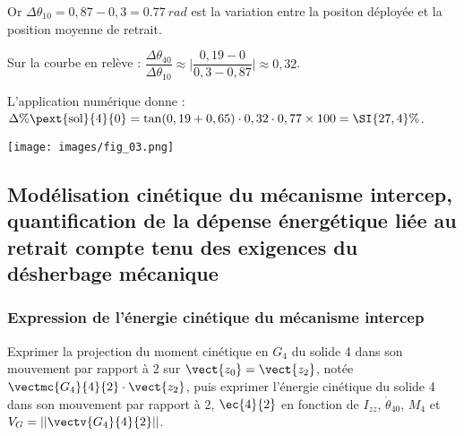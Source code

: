\documentclass[11pt]{article}
\begin{document}
\begin{UPSTIcorrige}
\begin{minipage}{0.55\textwidth}
Or $\Delta \theta_{10}=0,87-0,3=\SI{0,77}{rad}$ est la variation entre la positon déployée et la position moyenne de retrait.

Sur la courbe en relève  : $
\dfrac{\Delta \theta_{40}}{\Delta \theta_{10}}\approx \vert\dfrac{0,19-0}{0,3-0,87}\vert\approx 0,32
$.

L'application numérique donne : 
$\Delta \% \pext{\text{sol}}{4}{0}=\tan(0,19+0,65)\cdot 0,32 \cdot 0,77\times 100=\SI{27,4}{\%}$.

\end{minipage}
\begin{minipage}{0.4\textwidth}
\begin{center}
\texttt{[image: images/fig\_03.png]}
\end{center}
\end{minipage}



 
\end{UPSTIcorrige}

\subsection{Modélisation cinétique du mécanisme intercep, quantification de la dépense énergétique
liée au retrait compte tenu des exigences du désherbage mécanique}


\subsubsection{Expression de l’énergie cinétique du mécanisme intercep}


\UPSTIquestion  Exprimer la projection du moment cinétique en $G_4$ du solide 4 dans son mouvement par rapport à 2
sur $\vect{z_0}=\vect{z_2}$, notée $\vectmc{G_4}{4}{2}\cdot\vect{z_2}$, puis exprimer l’énergie cinétique du solide 4 dans son mouvement par rapport à 2, $\ec{4}{2}$ en fonction de $I_{zz}$, $\dot{\theta}_{40}$, $M_4$ et $V_G = \left|\left| \vectv{G_4}{4}{2} \right|\right|$.
\end{document}
